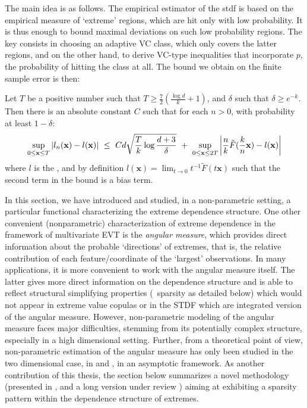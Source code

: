 The main idea is as follows. The empirical estimator of the {\sc stdf} is based on the empirical measure of `extreme' regions, which  are hit only with  low probability. It is thus enough to bound  maximal deviations on such low probability regions. 
 The key consists in choosing an adaptive VC class, which only covers the latter regions, and on the other hand, to derive VC-type inequalities that incorporate $p$, the probability of hitting the class at all. The bound we obtain on the finite sample error is then:

\begin{theorem}
\label{thm:l}
Let $T$ be a positive number such that $T \ge \frac{7}{2}(\frac{\log d}{k} + 1)$, and $\delta$ such that $\delta \ge e^{-k}$. Then there is an absolute constant $C$ such that for each $n >0$, with probability at least $1-\delta$:
\begin{align*}
\sup_{0 \le \mathbf{x} \le T} \left| l_n(\mathbf{x}) - l(\mathbf{x})
\right| ~\le~ Cd\sqrt{\frac{T}{k}\log\frac{d+3}{\delta}} ~+~ \sup_{0
  \le \mathbf{x} \le 2T}\left|\frac{n}{k} \tilde
  F(\frac{k}{n}\mathbf{x})- %
l(\mb x)\right|
\end{align*}
where $l$ is the \stdf, and by definition $l(\mathbf{x})= \lim_{t \to 0} t^{-1} \tilde F (t\mathbf{x}) $ such that the second term in the bound is a bias term.
\end{theorem}


In this section, we have introduced and studied, in a non-parametric setting, a particular functional characterizing the extreme dependence structure.
%
One other convenient (nonparametric) characterization of  extreme dependence in the framework of multivariate EVT is the \textit{angular measure}, which provides direct information about the probable `directions' of extremes, that is, the relative contribution of each feature/coordinate of the `largest' observations.
%
In many applications, it is more convenient to work with the angular measure itself. The latter gives more direct information on the dependence structure and is able to reflect structural simplifying properties (\eg~sparsity as detailed below) which would not appear in extreme value copulas or in the STDF which are integrated version of the angular measure.
However, non-parametric modeling of the angular measure faces major difficulties, stemming from its potentially complex structure, especially in a high dimensional setting.
Further, from a theoretical point of view, non-parametric estimation of the angular measure has only been studied in the two dimensional case, in \cite{Einmahl2001} and \cite{Einmahl2009}, in an asymptotic framework. As another contribution of this thesis, the section below summarizes a novel methodology (presented in \cite{AISTAT15}, \cite{NIPSWORKSHOP15} and a long version under review \cite{ARXIV16}) aiming at exhibiting a sparsity pattern within the dependence structure of extremes.



